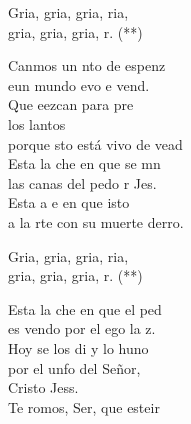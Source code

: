\begin{cancion}
	\begin{chorus}%
		Gria, gria, gria, ria,\\
		gria, gria, gria, r. (**)\jump\\
	\end{chorus}%
	Canmos un nto de espenz\\
	eun mundo evo e vend.  \\
	Que eezcan para pre \\
	los lantos\\
	porque sto está vivo de vead\\
	\jump
	Esta  la che en que se mn\\
	las canas del pedo r Jes.\\
	Esta a e en que isto\\
	a la rte con su muerte derro. \jump\\
	\begin{chorus}%
		Gria, gria, gria, ria,\\
		gria, gria, gria, r. (**)\jump\\
	\end{chorus}%
	Esta  la che en que el ped\\
	es vendo por el ego  la z.\\
	Hoy se  los di y lo huno\\
	por el unfo del Señor, \\
	Cristo Jess. \\
	\jump
	Te romos, Ser, que esteir\\

\end{cancion}
